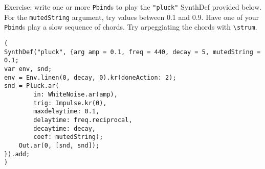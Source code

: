 Exercise: write one or more \texttt{Pbind}s to play the \texttt{"pluck"} SynthDef provided below. For the \texttt{mutedString} argument, try values between 0.1 and 0.9. Have one of your \texttt{Pbind}s play a slow sequence of chords. Try arpeggiating the chords with \texttt{\textbackslash strum}.

\begin{lstlisting}[style=SuperCollider-IDE, basicstyle=\scttfamily\footnotesize]
(
SynthDef("pluck", {arg amp = 0.1, freq = 440, decay = 5, mutedString = 0.1;
var env, snd;
env = Env.linen(0, decay, 0).kr(doneAction: 2);
snd = Pluck.ar(
        in: WhiteNoise.ar(amp),
        trig: Impulse.kr(0),
        maxdelaytime: 0.1,
        delaytime: freq.reciprocal,
        decaytime: decay,
        coef: mutedString);
    Out.ar(0, [snd, snd]);
}).add;
)
\end{lstlisting}